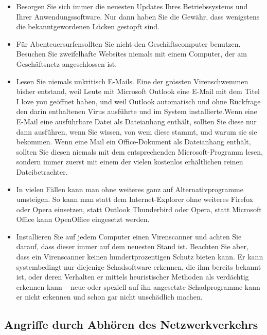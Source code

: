\begin{itemize}
    \item{ Besorgen Sie sich immer die neuesten Updates Ihres Betriebssystems und Ihrer Anwendungssoftware. Nur dann haben Sie die Gewähr,
    dass wenigstens die bekanntgewordenen Lücken gestopft sind.}
    \item{Für \glqq Abenteuersurfen\grqq sollten Sie nicht den Geschäftscomputer
    benutzen. Besuchen Sie zweifelhafte Websites niemals mit einem Computer, der am Geschäftsnetz angeschlossen ist.}
    \item{Lesen Sie niemals unkritisch E-Mails. Eine der grössten Virenschwemmen bisher entstand, weil Leute mit Microsoft Outlook
    eine E-Mail mit dem Titel \glqq I love you\grqq{} geöffnet haben, und weil Outlook
    automatisch und ohne Rückfrage den darin enthaltenen Virus ausführte und im System installierte.Wenn eine E-Mail eine ausführbare Datei
    als Dateianhang enthält, sollten Sie diese nur dann ausführen, wenn Sie wissen, von wem diese stammt, und warum sie sie bekommen.
    Wenn eine Mail ein Office-Dokument als Dateianhang enthält, sollten Sie diesen niemals mit dem entsprechenden Microsoft-Programm lesen,
    sondern immer zuerst mit einem der vielen kostenlos erhältlichen reinen Dateibetrachter.}
    \item{In vielen Fällen kann man ohne weiteres ganz auf Alternativprogramme umsteigen. So kann man statt dem
    Internet-Explorer ohne weiteres Firefox oder Opera einsetzen, statt Outlook Thunderbird oder Opera, statt
    Microsoft Office kann OpenOffice eingesetzt werden.}
    \item{Installieren Sie auf jedem Computer einen Virenscanner und achten Sie
    darauf, dass dieser immer auf dem neuesten Stand ist. Beachten Sie aber,
    dass ein Virenscanner keinen hundertprozentigen Schutz bieten kann. Er kann
    systembedingt nur diejenige Schadsoftware erkennen, die ihm bereits bekannt
    ist, oder deren Verhalten er mittels heuristischer Methoden als verdächtig
    erkennen kann -- neue oder speziell auf ihn angesetzte Schadprogramme kann
    er nicht erkennen und schon gar nicht unschädlich machen.}

\end{itemize}

\subsection{Angriffe durch Abhören des Netzwerkverkehrs}

